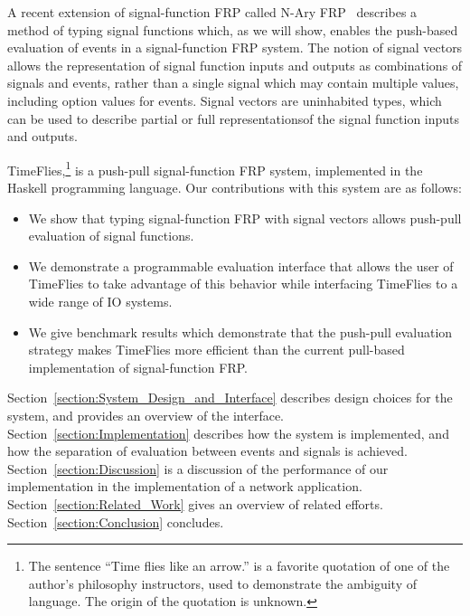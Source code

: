 A recent extension of signal-function FRP called N-Ary FRP~\cite{Sculthorpe2011}
describes a method of typing signal functions which, as we will show, enables
the push-based evaluation of events in a signal-function FRP system. The notion
of signal vectors allows the representation of signal function inputs and
outputs as combinations of signals and events, rather than a single signal which
may contain multiple values, including option values for events. Signal vectors
are uninhabited types, which can be used to describe partial or full
representationsof the signal function inputs and outputs.

TimeFlies,\footnote{The sentence ``Time flies like an arrow.'' is a 
favorite quotation of one of the author's philosophy instructors, used to
demonstrate the ambiguity of language. The origin of the quotation is unknown.}
is a push-pull signal-function FRP system, implemented in the Haskell
programming language. Our contributions with this system are as follows:

\begin{itemize}
  \item We show that typing signal-function FRP with signal vectors allows
        push-pull evaluation of signal functions.
  \item We demonstrate a programmable evaluation interface that allows the user
        of TimeFlies to take advantage of this behavior while interfacing
        TimeFlies to a wide range of IO systems.
  \item We give benchmark results which demonstrate that the push-pull
        evaluation strategy makes TimeFlies more efficient than the current
        pull-based implementation of signal-function FRP.
\end{itemize}

Section~\ref{section:System_Design_and_Interface} describes design choices for
the system, and provides an overview of the interface.
Section~\ref{section:Implementation} describes how the system is implemented,
and how the separation of evaluation between events and signals is achieved.
Section~\ref{section:Discussion} is a discussion of the performance of our
implementation in the implementation of a network application. Section~\ref{section:Related_Work} gives an overview of
related efforts. Section~\ref{section:Conclusion} concludes.

